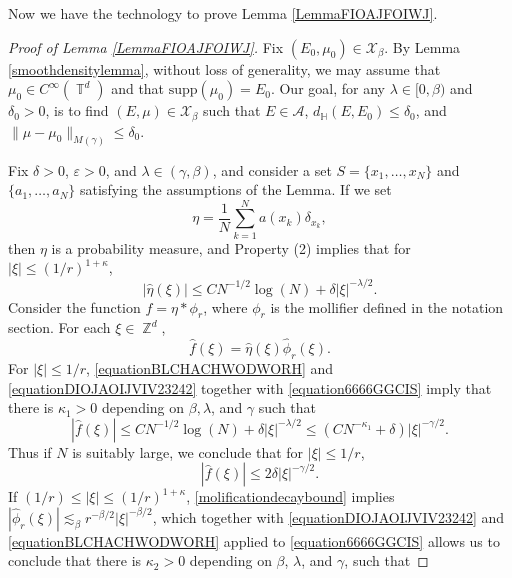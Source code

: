 \documentclass[dvipsnames,letterpaper,12pt]{article}
\numberwithin{equation}{section}
\DeclareMathOperator{\ZZ}{\mathbb{Z}}
\DeclareMathOperator{\TT}{\mathbb{T}}
\numberwithin{theorem}{section}
\begin{document}
Now we have the technology to prove Lemma \ref{LemmaFIOAJFOIWJ}.

\begin{proof}[Proof of Lemma \ref{LemmaFIOAJFOIWJ}]
    Fix $(E_0,\mu_0) \in \mathcal{X}_\beta$. By Lemma \ref{smoothdensitylemma}, without loss of generality, we may assume that $\mu_0 \in C^\infty(\TT^d)$ and that $\text{supp}(\mu_0) = E_0$. Our goal, for any $\lambda \in [0,\beta)$ and $\delta_0 > 0$, is to find $(E,\mu) \in \mathcal{X}_\beta$ such that $E \in \mathcal{A}$, $d_{\mathbb{H}}(E,E_0) \leq \delta_0$, and $\| \mu - \mu_0 \|_{M(\gamma)} \leq \delta_0$.

    Fix $\delta > 0$, $\varepsilon > 0$, and $\lambda \in (\gamma,\beta)$, and consider a set $S = \{ x_1, \dots, x_N \}$ and $\{ a_1, \dots, a_N \}$ satisfying the assumptions of the Lemma. If we set
    \[ \eta = \frac{1}{N} \sum_{k = 1}^N a(x_k) \delta_{x_k}, \]
    then $\eta$ is a probability measure, and Property (2) implies that for $|\xi| \leq (1/r)^{1 + \kappa}$,
    \begin{equation} \label{equationBLCHACHWODWORH}
        |\widehat{\eta}(\xi)| \leq C N^{-1/2} \log(N) + \delta |\xi|^{-\lambda/2}.
    \end{equation}
    Consider the function $f = \eta * \phi_r$, where $\phi_r$ is the mollifier defined in the notation section. For each $\xi \in \ZZ^d$,
    \begin{equation} \label{equation6666GGCIS}
        \widehat{f}(\xi) = \widehat{\eta}(\xi) \widehat{\phi}_r(\xi).
    \end{equation}
    For $|\xi| \leq 1/r$, \eqref{equationBLCHACHWODWORH} and \eqref{equationDIOJAOIJVIV23242} together with \eqref{equation6666GGCIS} imply that there is $\kappa_1 > 0$ depending on $\beta,\lambda$, and $\gamma$ such that
    \begin{equation}
        |\widehat{f}(\xi)| \leq C N^{-1/2} \log(N) + \delta |\xi|^{-\lambda/2} \leq (C N^{-\kappa_1} + \delta) |\xi|^{-\gamma/2}.
    \end{equation}
    Thus if $N$ is suitably large, we conclude that for $|\xi| \leq 1/r$,
    \begin{equation} \label{equationOIJVIOJOIJ21314}
        |\widehat{f}(\xi)| \leq 2 \delta |\xi|^{-\gamma/2}.
    \end{equation}
    If $(1/r) \leq |\xi| \leq (1/r)^{1+\kappa}$, \eqref{molificationdecaybound} implies $|\widehat{\phi}_r(\xi)| \lesssim_\beta r^{-\beta/2} |\xi|^{-\beta/2}$, which together with \eqref{equationDIOJAOIJVIV23242} and \eqref{equationBLCHACHWODWORH} applied to \eqref{equation6666GGCIS} allows us to conclude that there is $\kappa_2 > 0$ depending on $\beta$, $\lambda$, and $\gamma$, such that

\end{proof}
\end{document}
